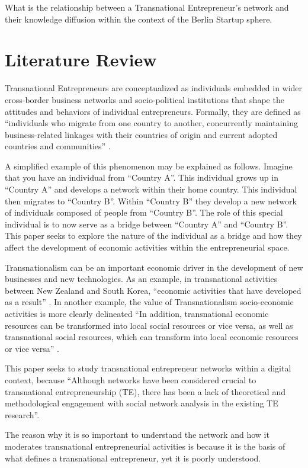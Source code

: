 What is the relationship between a Transnational Entrepreneur's
network and their knowledge diffusion within the context of the Berlin
Startup sphere.

\section{Literature Review}
Transnational Entrepreneurs are conceptualized as individuals embedded
in wider cross-border business networks and socio-political
institutions that shape the attitudes and behaviors of individual
entrepreneurs. Formally, they are defined as ``individuals who migrate
from one country to another, concurrently maintaining business-related
linkages with their countries of origin and current adopted countries
and communities'' \cite{Drori.2009}.

A simplified example of this phenomenon may be explained as follows.
Imagine that you have an individual from ``Country A''. This
individual grows up in ``Country A'' and develops a network within
their home country. This individual then migrates to ``Country
B''. Within ``Country B'' they develop a new network of individuals
composed of people from ``Country B''. The role of this special
individual is to now serve as a bridge between ``Country A'' and
``Country B''. This paper seeks to explore the nature of the
individual as a bridge and how they affect the development of economic
activities within the entrepreneurial space.

Transnationalism can be an important economic driver in the
development of new businesses and new technologies. As an example, in
transnational activities between New Zealand and South Korea,
``economic activities that have developed as a result''
\cite{Collins.2008}. In another example, the value of Transnationalism
socio-economic activities is more clearly delineated ``In addition,
transnational economic resources can be transformed into local social
resources or vice versa, as well as transnational social resources,
which can transform into local economic resources or vice versa''
\cite{Ren.2015}.

This paper seeks to study transnational entrepreneur networks within a
digital context, because ``Although networks have been considered
crucial to transnational entrepreneurship (TE), there has been a lack
of theoretical and methodological engagement with social network
analysis in the existing TE research''\cite{Chen.2009}.

The reason why it is so important to understand the network and how it
moderates transnational entrepreneurial activities is because it is
the basis of what defines a transnational entrepreneur, yet it is
poorly understood.

